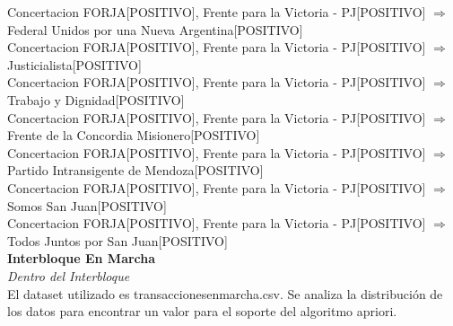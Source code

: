 \documentclass{endm}
\begin{document}
{Concertacion FORJA[POSITIVO], Frente para la Victoria - PJ[POSITIVO]}  $\Longrightarrow$ {Federal Unidos por una Nueva Argentina[POSITIVO]} \\

{Concertacion FORJA[POSITIVO], Frente para la Victoria - PJ[POSITIVO]}  $\Longrightarrow$ {Justicialista[POSITIVO]}      \\                    

{Concertacion FORJA[POSITIVO], Frente para la Victoria - PJ[POSITIVO]}  $\Longrightarrow$ {Trabajo y Dignidad[POSITIVO]}     \\                

{Concertacion FORJA[POSITIVO], Frente para la Victoria - PJ[POSITIVO]}  $\Longrightarrow$ {Frente de la Concordia Misionero[POSITIVO]}       \\

{Concertacion FORJA[POSITIVO], Frente para la Victoria - PJ[POSITIVO]}  $\Longrightarrow$ {Partido Intransigente de Mendoza[POSITIVO]}       \\

{Concertacion FORJA[POSITIVO], Frente para la Victoria - PJ[POSITIVO]}  $\Longrightarrow$ {Somos San Juan[POSITIVO]}         \\

{Concertacion FORJA[POSITIVO], Frente para la Victoria - PJ[POSITIVO]}  $\Longrightarrow$ {Todos Juntos por San Juan[POSITIVO]}          \\    

\textbf{Interbloque En Marcha}\\

\textit{Dentro del Interbloque} \\

El dataset utilizado es transaccionesenmarcha.csv. Se analiza la distribución de los datos para encontrar un valor para el soporte del algoritmo apriori. \\
\end{document}
